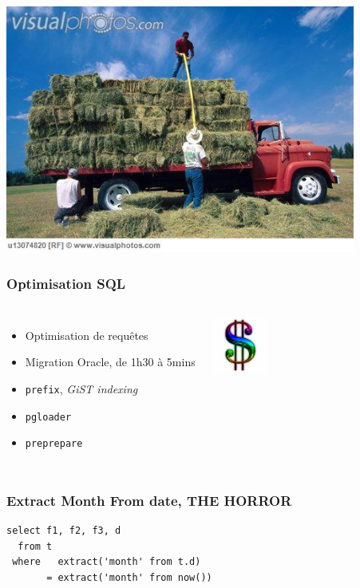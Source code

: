 \documentclass{beamer}
\begin{document}
\begin{frame}[fragile]
\begin{center}
  \includegraphics[height=22em]{loaded-truck.jpg}
\end{center}
\end{frame}


\begin{frame}[fragile]
  \frametitle{Optimisation SQL}

  \vfill

\begin{columns}[c]

  \begin{itemize}
  \item Optimisation de requêtes
  \item Migration Oracle, de 1h30 à 5mins
  \item \texttt{prefix}, \textit{GiST indexing}
  \item \texttt{pgloader}
  \item \texttt{preprepare}
  \end{itemize}

\begin{center}
  \includegraphics[height=5em]{Dollar-sign.jpg}
\end{center}
\end{columns}
\end{frame}

\begin{frame}[fragile]
  \frametitle{Extract Month From date, THE HORROR}

  \vfill

\begin{verbatim}
select f1, f2, f3, d
  from t
 where   extract('month' from t.d)
       = extract('month' from now())
\end{verbatim}
\end{frame}
\end{document}
